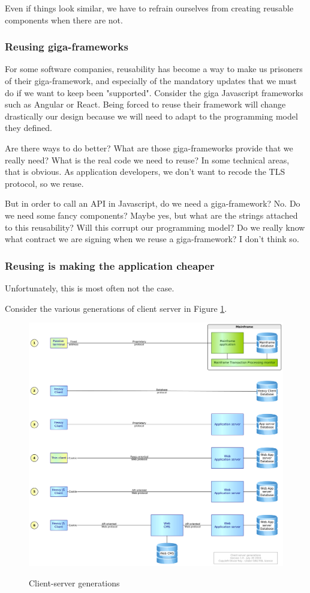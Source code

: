 \documentclass[]{article}
\begin{document}
Even if things look similar, we have to refrain ourselves from creating reusable components when there are not.

\subsubsection{Reusing giga-frameworks}

For some software companies, reusability has become a way to make us prisoners of their giga-framework, and especially of the mandatory updates that we must do if we want to keep been "supported". Consider the giga Javascript frameworks such as Angular or React. Being forced to reuse their framework will change drastically our design because we will need to adapt to the programming model they defined.

Are there ways to do better? What are those giga-frameworks provide that we really need? What is the real code we need to reuse? In some technical areas, that is obvious. As application developers, we don't want to recode the TLS protocol, so we reuse.

But in order to call an API in Javascript, do we need a giga-framework? No. Do we need some fancy components? Maybe yes, but what are the strings attached to this reusability? Will this corrupt our programming model? Do we really know what contract we are signing when we reuse a giga-framework? I don't think so.

\subsubsection{Reusing is making the application cheaper}

Unfortunately, this is most often not the case.

Consider the various generations of client server in Figure \ref{fig:cs-gen}.

\begin{figure}[t]
\caption{Client-server generations}
\includegraphics[width=\textwidth]{client-server-generations.png}
\label{fig:cs-gen}
\end{figure}
\end{document}
